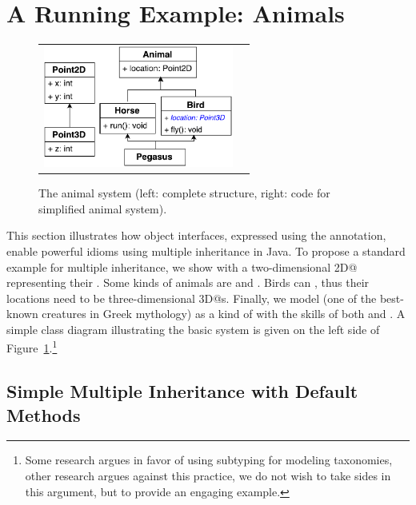 \section{A Running Example: Animals}\label{sec:ep}

\begin{figure}
\saveSpaceFig
\begin{tabular}{c|c}
\includegraphics[height=4cm]{PegasusDetail.pdf}\hspace{20pt} &
\begin{minipage}{7cm}
\vspace{-90pt}
\end{minipage}
\end{tabular}
\caption{The animal system (left: complete structure, right: code for simplified animal system).}\label{fig:pegasus}
\end{figure}

This section illustrates how object interfaces, expressed using the \mixinAnn{} annotation, enable powerful
idioms using multiple inheritance in Java.
To propose a standard example for multiple inheritance, we show \Q@Animal@s with a two-dimensional \Q@Point2D@ representing their \Q@location@.
Some kinds of animals are \Q@Horse@s and \Q@Bird@s.
Birds can \Q@fly@, thus their locations need to be three-dimensional \Q@Point3D@s.
Finally, we model \Q@Pegasus@ (one of the best-known creatures in Greek
mythology) as a kind of \Q@Animal@ with the skills
of both \Q@Horse@s and \Q@Bird@s. A simple class diagram illustrating
the basic system is given on the left side of Figure~\ref{fig:pegasus}.\footnote{Some research argues in favor of using subtyping for modeling taxonomies, other research argues against this practice, we do not wish to take sides in this argument, but to provide an engaging example.}

\subsection{Simple Multiple Inheritance with Default
  Methods}\label{sec:simple}

